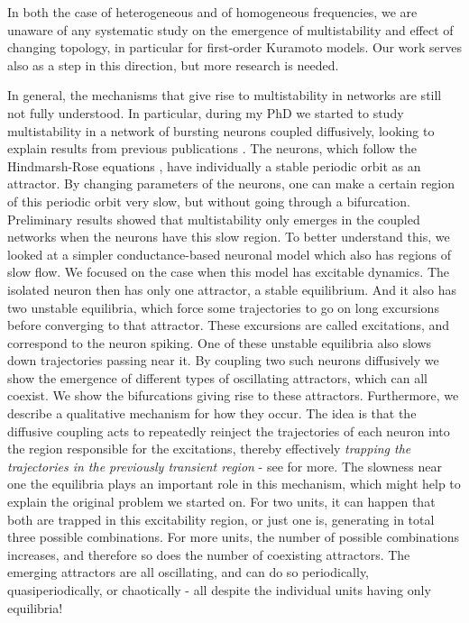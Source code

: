 In both the case of heterogeneous and of homogeneous frequencies, we are unaware of any systematic study on the emergence of multistability and effect of changing topology, in particular for first-order Kuramoto models. Our work serves also as a step in this direction, but more research is needed. 

In general, the mechanisms that give rise to multistability in networks are still not fully understood. In particular, during my PhD we started to study multistability in a network of bursting neurons coupled diffusively, looking to explain results from previous publications \cite{rossi2021phase}. The neurons, which follow the Hindmarsh-Rose equations \cite{hindmarsh1984a}, have individually a stable periodic orbit as an attractor. By changing parameters of the neurons, one can make a certain region of this periodic orbit very slow, but without going through a bifurcation. Preliminary results showed that multistability only emerges in the coupled networks when the neurons have this slow region. To better understand this, we looked at a simpler conductance-based neuronal model \cite{izhikevichbook} which also has regions of slow flow. We focused on the case when this model has excitable dynamics. The isolated neuron then has only one attractor, a stable equilibrium. And it also has two unstable equilibria, which force some trajectories to go on long excursions before converging to that attractor. These excursions are called excitations, and correspond to the neuron spiking. One of these unstable equilibria also slows down trajectories passing near it. By coupling two such neurons diffusively we show the emergence of different types of oscillating attractors, which can all coexist. We show the bifurcations giving rise to these attractors. Furthermore, we describe a qualitative mechanism for how they occur. The idea is that the diffusive coupling acts to repeatedly reinject the trajectories of each neuron into the region responsible for the excitations, thereby effectively \textit{trapping the trajectories in the previously transient region} - see  for more. The slowness near one the equilibria plays an important role in this mechanism, which might help to explain the original problem we started on. For two units, it can happen that both are trapped in this excitability region, or just one is, generating in total three possible combinations. For more units, the number of possible combinations increases, and therefore so does the number of coexisting attractors. The emerging attractors are all oscillating, and can do so periodically, quasiperiodically, or chaotically - all despite the individual units having only equilibria!  
